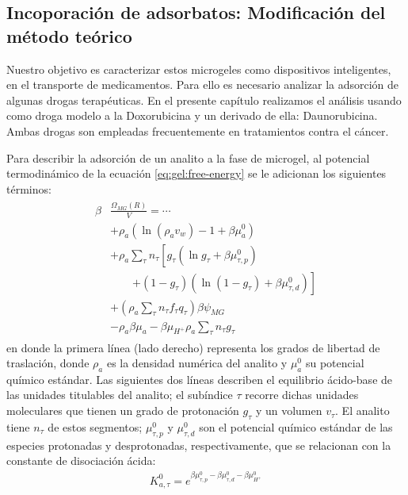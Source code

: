 \subsection{Incoporaci\'on  de adsorbatos: Modificaci\'on del m\'etodo te\'orico}\label{sec:gel:adsorcion}

Nuestro objetivo es caracterizar estos microgeles como dispositivos inteligentes, en el transporte de medicamentos. Para ello es necesario analizar la adsorci\'on de algunas drogas terap\'euticas. En el presente cap\'itulo realizamos el an\'alisis usando como droga modelo a la Doxorubicina y un derivado de ella: Daunorubicina. Ambas drogas son empleadas frecuentemente en tratamientos contra el c\'ancer. 

Para describir la adsorci\'on de un analito a la fase de microgel,
al potencial termodin\'amico de la ecuaci\'on \ref{eq:gel:free-energy} se le adicionan los siguientes t\'erminos:
%
%
%
\begin{align}
\begin{aligned}
\beta&\frac{\Omega_{MG}(R)}{V}= \cdots\\&+ \rho_a\left(\ln\left(\rho_a v_w\right) -1 + \beta\mu^0_a\right) \\
& + \rho_a \sum_\tau n_\tau  \left[g_\tau(\ln g_\tau+ \beta\mu^0_{\tau,p})\right.\\
&\qquad\left.+(1-g_\tau)(\ln (1-g_\tau)+\beta\mu^0_{\tau, d})\right] \\
& +  \left( \rho_a \sum_\tau n_\tau f_\tau q_\tau\right)\beta\psi_{MG}\\
& -\rho_a\beta\mu_a
 -\beta\mu_{H^+} \rho_a \sum_\tau n_\tau g_\tau
\end{aligned}
\label{eq:gel:ads}
\end{align}
%
\noindent en donde la primera l\'inea (lado derecho) representa los grados de libertad de traslaci\'on,
donde $\rho_a$ es la densidad num\'erica del analito y $\mu_a^0$ su potencial qu\'imico est\'andar.
Las siguientes dos l\'ineas describen el equilibrio \'acido-base de las unidades titulables del analito;
el sub\'indice $\tau$ recorre dichas unidades moleculares que tienen un grado de protonaci\'on $g_\tau$ y un volumen $v_\tau$.
El analito tiene $n_\tau$ de estos segmentos;
$\mu^0_{\tau, p}$ y $\mu^0_{\tau,d}$ son el potencial qu\'imico est\'andar de las especies protonadas y desprotonadas, respectivamente, que se relacionan con la constante de disociaci\'on \'acida:
%
\begin{align}
K^0_{a,\tau}= e^{\beta\mu^0_{\tau, p}-\beta\mu^0_{\tau,d}-\beta\mu^0_{H^+}}
\end{align}
%

